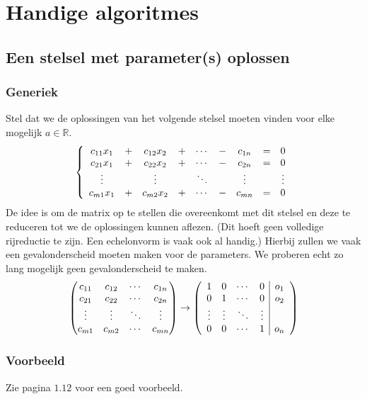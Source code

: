 \documentclass[lineaire_algebra_oplossingen.tex]{subfiles}
\begin{document}
\chapter{Handige algoritmes}
\section{Een stelsel met parameter(s) oplossen}
\subsection*{Generiek}
Stel dat we de oplossingen van het volgende stelsel moeten vinden voor elke mogelijk $a \in \mathbb{R}$.
\[
\left\{
\begin{array}{c c c c c c c c c}
c_{11}x_1 &+& c_{12}x_2 &+& \cdots &-& c_{1n} &=& 0\\
c_{21}x_1 &+& c_{22}x_2 &+& \cdots &-& c_{2n} &=& 0\\
\vdots && \vdots && \ddots && \vdots && \vdots\\
c_{m1}x_1 &+& c_{m2}x_2 &+& \cdots &-& c_{mn} &=& 0\\
\end{array}
\right.
\]
De idee is om de matrix op te stellen die overeenkomt met dit stelsel en deze te reduceren tot we de oplossingen kunnen aflezen.
(Dit hoeft geen volledige rijreductie te zijn. Een echelonvorm is vaak ook al handig.)
Hierbij zullen we vaak een gevalonderscheid moeten maken voor de parameters.
We proberen echt zo lang mogelijk geen gevalonderscheid te maken.
\[
\begin{pmatrix}
c_{11} &c_{12} & \cdots & c_{1n}\\
c_{21} & c_{22} & \cdots & c_{2n}\\
\vdots & \vdots & \ddots & \vdots \\
c_{m1} & c_{m2} & \cdots & c_{mn}\\
\end{pmatrix}
\rightarrow
\left(
\begin{array}{c c c c | c}
1 & 0 & \cdots & 0 & o_1\\
0 & 1 & \cdots & 0 & o_2\\
\vdots & \vdots & \ddots & \vdots \\
0 & 0 & \cdots & 1 & o_n\\
\end{array}
\right)
\]

\subsection*{Voorbeeld}
Zie pagina $1.12$ voor een goed voorbeeld.
\end{document}
